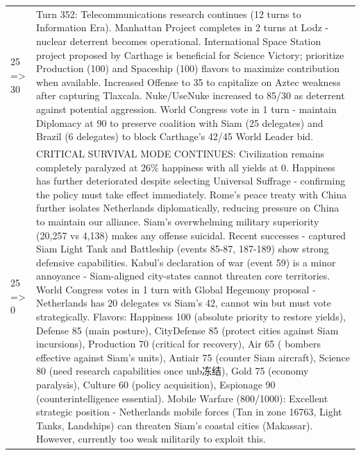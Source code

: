 \begin{longtable}{p{}p{}}
25 => 30 & Turn 352: Telecommunications research continues (12 turns to Information Era). Manhattan Project completes in 2 turns at Lodz - nuclear deterrent becomes operational. International Space Station project proposed by Carthage is beneficial for Science Victory; prioritize Production (100) and Spaceship (100) flavors to maximize contribution when available. Increased Offense to 35 to capitalize on Aztec weakness after capturing Tlaxcala. Nuke/UseNuke increased to 85/30 as deterrent against potential aggression. World Congress vote in 1 turn - maintain Diplomacy at 90 to preserve coalition with Siam (25 delegates) and Brazil (6 delegates) to block Carthage's 42/45 World Leader bid. \\
25 => 0 & CRITICAL SURVIVAL MODE CONTINUES: Civilization remains completely paralyzed at 26\% happiness with all yields at 0. Happiness has further deteriorated despite selecting Universal Suffrage - confirming the policy must take effect immediately. Rome's peace treaty with China further isolates Netherlands diplomatically, reducing pressure on China to maintain our alliance. Siam's overwhelming military superiority (20,257 vs 4,138) makes any offense suicidal. Recent successes - captured Siam Light Tank and Battleship (events 85-87, 187-189) show strong defensive capabilities. Kabul's declaration of war (event 59) is a minor annoyance - Siam-aligned city-states cannot threaten core territories. World Congress votes in 1 turn with Global Hegemony proposal - Netherlands has 20 delegates vs Siam's 42, cannot win but must vote strategically. Flavors: Happiness 100 (absolute priority to restore yields), Defense 85 (main posture), CityDefense 85 (protect cities against Siam incursions), Production 70 (critical for recovery), Air 65 ( bombers effective against Siam's units), Antiair 75 (counter Siam aircraft), Science 80 (need research capabilities once unb冻结), Gold 75 (economy paralysis), Culture 60 (policy acquisition), Espionage 90 (counterintelligence essential). Mobile Warfare (800/1000): Excellent strategic position - Netherlands mobile forces (Tan in zone 16763, Light Tanks, Landships) can threaten Siam's coastal cities (Makassar). However, currently too weak militarily to exploit this. \\

\end{longtable}

